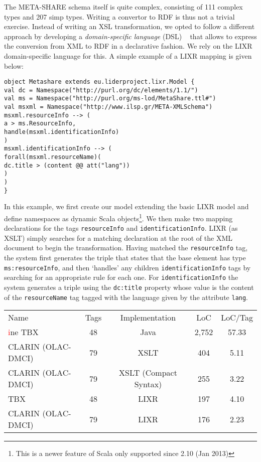 \documentclass{llncs}
\begin{document}
{The META-SHARE schema itself is quite complex, consisting of 111 complex types and 207 simp types. 
Writing a convertor to RDF is thus not a trivial exercise. Instead of writing an XSL transformation, we opted to follow a different approach by developing a \emph{domain-specific language} (DSL) ~\cite{fowler2010domain} that allows to express the conversion from XML to RDF in a declarative fashion.
We rely on the LIXR domain-specific language for this. A simple example of a
LIXR mapping is given below:
{\footnotesize
\begin{verbatim}
object Metashare extends eu.liderproject.lixr.Model {
val dc = Namespace("http://purl.org/dc/elements/1.1/")
val ms = Namespace("http://purl.org/ms-lod/MetaShare.ttl#")
val msxml = Namespace("http://www.ilsp.gr/META-XMLSchema")
msxml.resourceInfo --> (
a > ms.ResourceInfo,
handle(msxml.identificationInfo)
)
msxml.identificationInfo --> (
forall(msxml.resourceName)(
dc.title > (content @@ att("lang"))
)
)
}
\end{verbatim}}
In this example, we first create our model extending the basic LIXR model and
define namespaces as dynamic Scala objects\footnote{This is a newer feature of
Scala only supported since 2.10 (Jan 2013)}. We then make two mapping
declarations for the tags {\tt resourceInfo} and {\tt identificationInfo}. LIXR (as
XSLT) simply searches for a matching declaration at the root of the XML document
to begin the transformation. Having matched the {\tt resourceInfo} tag, the system
first generates the triple that states that the base element has type
{\tt ms:resourceInfo}, and then `handles' any children {\tt identificationInfo} tags by
searching for an appropriate rule for each one. For {\tt identificationInfo} the
system generates a triple using the {\tt dc:title} property whose value is the
content of the {\tt resourceName} tag tagged with the language given by the
attribute {\tt lang}.
\begin{table}
\begin{center}
\begin{tabular}{p{4cm}|cccc}
Name & Tags & Implementation & LoC & LoC/Tag \\
\textcolor{red}ine
TBX & 48 & Java & 2,752 & 57.33 \\
CLARIN (OLAC-DMCI) & 79 & XSLT & 404 & 5.11 \\
CLARIN (OLAC-DMCI) & 79 & XSLT (Compact Syntax) & 255 & 3.22 \\
\hline
TBX & 48 & LIXR & 197 & 4.10 \\
CLARIN (OLAC-DMCI) & 79 & LIXR & 176 & 2.23 \\

\end{tabular}
\end{center}
\end{table}}
\end{document}
